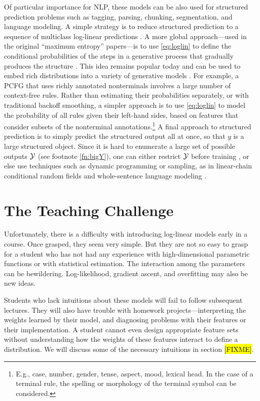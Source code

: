 \documentclass[11pt,letterpaper]{article}
\newcommand{\Note}[1]{}
\renewcommand{\Note}[1]{\hl{[#1]}}
\newcommand{\FIXME}{\Note{FIXME}}
\begin{document}
Of particular importance for NLP, these models can be also used for
structured prediction problems such as tagging, parsing, chunking,
segmentation, and language modeling.  A simple strategy is to reduce
structured prediction to a sequence of multiclass log-linear
predictions \cite{ratnaparkhi-1998}.  A more global approach---used in
the original ``maximum entropy'' papers---is to use \eqref{eq:loglin}
to define the conditional probabilities of the steps in a generative
process that gradually produces the structure
\cite{rosenfeld-1994,berger-dellapietra-dellapietra-1996}.  This idea
remains popular today and can be used to embed rich distributions
into a variety of generative models \cite{bergkirkpatrick-et-al-2010}.
For example, a PCFG that uses richly annotated nonterminals involves a
large number of context-free rules.  Rather than estimating their
probabilities separately, or with traditional backoff smoothing, a
simpler approach is to use \eqref{eq:loglin} to model the probability
of all rules given their left-hand sides, based on features that
consider subsets of the nonterminal annotations.\footnote{E.g., case,
  number, gender, tense, aspect, mood, lexical head.  In the case of a
  terminal rule, the spelling or morphology of the terminal symbol can
  be considered.}  A final approach to structured prediction is to
simply predict the structured output all at once, so that $y$ is a
large structured object.  Since it is hard to enumerate
a large set of possible outputs ${\cal Y}$ (see footnote
\ref{fn:bigY}), one can either restrict ${\cal Y}$ before training
\cite{johnson-et-al-1999}, or else use techniques such as dynamic
programming or sampling, as in linear-chain conditional random fields
\cite{lafferty-mccallum-pereira-2001} and whole-sentence language
modeling \cite{rosenfeld-chen-zhu-2001}.

\section{The Teaching Challenge}

Unfortunately, there is a difficulty with introducing log-linear
models early in a course.  Once grasped, they seem very simple.  But
they are not so easy to grasp for a student who has not had any
experience with high-dimensional parametric functions or with
statistical estimation.  The interaction among the parameters can be
bewildering.  Log-likelihood, gradient ascent, and overfitting may also
be new ideas.

Students who lack intuitions about these models will fail to follow
subsequent lectures.  They will also have trouble with homework
projects---interpreting the weights learned by their model, and
diagnosing problems with their features or their implementation.  A
student cannot even design appropriate feature sets without
understanding how the weights of these features interact to define a
distribution.  We will discuss some of the necessary intuitions in
section \FIXME.
\end{document}
